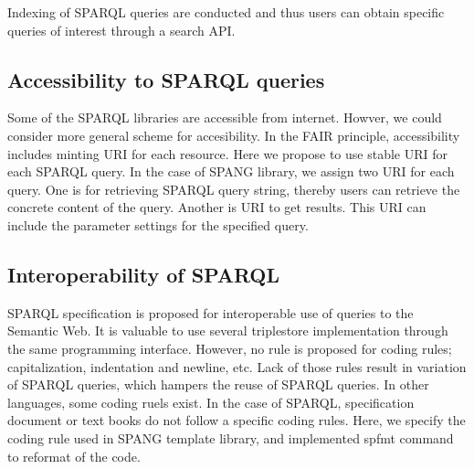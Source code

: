 \documentclass[runningheads]{llncs}
\begin{document}
Indexing of SPARQL queries are conducted and thus users can obtain specific queries of interest through a search API.

\subsection{Accessibility to SPARQL queries}
Some of the SPARQL libraries are accessible from internet. Howver, we could consider more general scheme for accesibility. In the FAIR principle, accessibility includes minting URI for each resource. Here we propose to use stable URI for each SPARQL query.
In the case of SPANG library, we assign two URI for each query. One is for retrieving SPARQL query string, thereby users can retrieve the concrete content of the query. Another is URI to get results. This URI can include the parameter settings for the specified query.

\subsection{Interoperability of SPARQL}
SPARQL specification is proposed for interoperable use of queries to the Semantic Web. It is valuable to use several triplestore implementation through the same programming interface. However, no rule is proposed for coding rules; capitalization, indentation and newline, etc. Lack of those rules result in variation of SPARQL queries, which hampers the reuse of SPARQL queries. In other languages, some coding ruels exist. In the case of SPARQL, specification document or text books do not follow a specific coding rules. Here, we specify the coding rule used in SPANG template library, and implemented spfmt command to reformat of the code.
\end{document}
